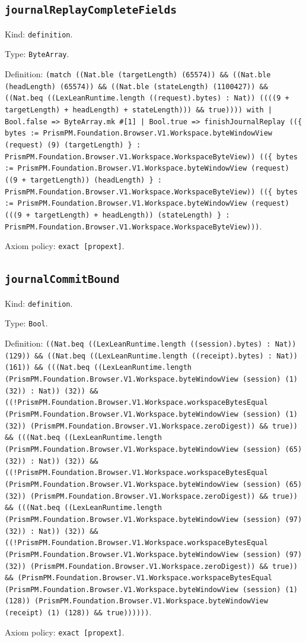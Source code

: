 \documentclass[11pt]{article}
\begin{document}
\subsection*{\texttt{journalReplayCompleteFields}}
\noindent Kind: \texttt{definition}.\par
\noindent Type: \texttt{ByteArray}.\par
\noindent Definition: \texttt{(match ((Nat.ble (targetLength) (65574)) \&\& ((Nat.ble (headLength) (65574)) \&\& ((Nat.ble (stateLength) (1100427)) \&\& ((Nat.beq ((LexLeanRuntime.length ((request).bytes) : Nat)) ((((9 + targetLength) + headLength) + stateLength))) \&\& true)))) with | Bool.false => ByteArray.mk \#[1] | Bool.true => finishJournalReplay ((\{ bytes := PrismPM.Foundation.Browser.V1.Workspace.byteWindowView (request) (9) (targetLength) \} : PrismPM.Foundation.Browser.V1.Workspace.WorkspaceByteView)) ((\{ bytes := PrismPM.Foundation.Browser.V1.Workspace.byteWindowView (request) ((9 + targetLength)) (headLength) \} : PrismPM.Foundation.Browser.V1.Workspace.WorkspaceByteView)) ((\{ bytes := PrismPM.Foundation.Browser.V1.Workspace.byteWindowView (request) (((9 + targetLength) + headLength)) (stateLength) \} : PrismPM.Foundation.Browser.V1.Workspace.WorkspaceByteView)))}.\par
\noindent Axiom policy: \texttt{exact [propext]}.\par
\subsection*{\texttt{journalCommitBound}}
\noindent Kind: \texttt{definition}.\par
\noindent Type: \texttt{Bool}.\par
\noindent Definition: \texttt{((Nat.beq ((LexLeanRuntime.length ((session).bytes) : Nat)) (129)) \&\& ((Nat.beq ((LexLeanRuntime.length ((receipt).bytes) : Nat)) (161)) \&\& (((Nat.beq ((LexLeanRuntime.length (PrismPM.Foundation.Browser.V1.Workspace.byteWindowView (session) (1) (32)) : Nat)) (32)) \&\& ((!PrismPM.Foundation.Browser.V1.Workspace.workspaceBytesEqual (PrismPM.Foundation.Browser.V1.Workspace.byteWindowView (session) (1) (32)) (PrismPM.Foundation.Browser.V1.Workspace.zeroDigest)) \&\& true)) \&\& (((Nat.beq ((LexLeanRuntime.length (PrismPM.Foundation.Browser.V1.Workspace.byteWindowView (session) (65) (32)) : Nat)) (32)) \&\& ((!PrismPM.Foundation.Browser.V1.Workspace.workspaceBytesEqual (PrismPM.Foundation.Browser.V1.Workspace.byteWindowView (session) (65) (32)) (PrismPM.Foundation.Browser.V1.Workspace.zeroDigest)) \&\& true)) \&\& (((Nat.beq ((LexLeanRuntime.length (PrismPM.Foundation.Browser.V1.Workspace.byteWindowView (session) (97) (32)) : Nat)) (32)) \&\& ((!PrismPM.Foundation.Browser.V1.Workspace.workspaceBytesEqual (PrismPM.Foundation.Browser.V1.Workspace.byteWindowView (session) (97) (32)) (PrismPM.Foundation.Browser.V1.Workspace.zeroDigest)) \&\& true)) \&\& (PrismPM.Foundation.Browser.V1.Workspace.workspaceBytesEqual (PrismPM.Foundation.Browser.V1.Workspace.byteWindowView (session) (1) (128)) (PrismPM.Foundation.Browser.V1.Workspace.byteWindowView (receipt) (1) (128)) \&\& true))))))}.\par
\noindent Axiom policy: \texttt{exact [propext]}.\par
\end{document}

